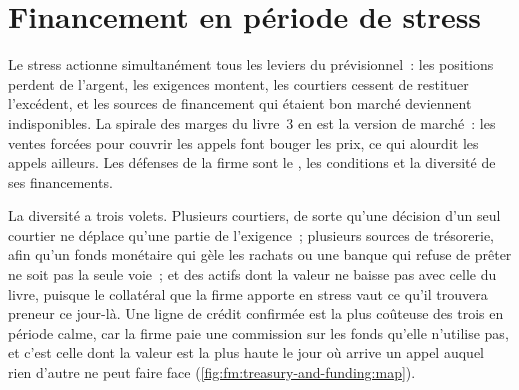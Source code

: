 \begin{omfigure}

\label{fig:fm:treasury-and-funding:req}
\end{omfigure}

\section{Financement en période de stress}

Le stress actionne simultanément tous les leviers du prévisionnel~: les positions perdent de l'argent, les exigences montent, les courtiers cessent de restituer l'excédent, et les sources de financement
qui étaient bon marché deviennent indisponibles. La spirale des marges du livre~3 en est la version de marché~: les ventes forcées pour couvrir les appels font bouger les prix, ce qui alourdit
les appels ailleurs. Les défenses de la firme sont le , les conditions et la diversité de ses financements.

La diversité a trois volets. Plusieurs courtiers, de sorte qu'une décision d'un seul courtier ne déplace qu'une partie de l'exigence~; plusieurs sources de trésorerie, afin
qu'un fonds monétaire qui gèle les rachats ou une banque qui refuse de prêter ne soit pas la seule voie~; et des actifs dont la valeur ne baisse pas avec celle du livre, puisque le
collatéral que la firme apporte en stress vaut ce qu'il trouvera preneur ce jour-là. Une ligne de crédit confirmée est la plus coûteuse des trois en période calme,
car la firme paie une commission sur les fonds qu'elle n'utilise pas, et c'est celle dont la valeur est la plus haute le jour où arrive un appel auquel
rien d'autre ne peut faire face (\cref{fig:fm:treasury-and-funding:map}).

